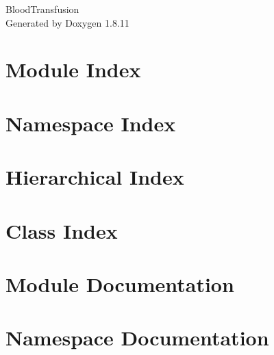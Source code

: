 \documentclass[twoside]{book}
\newcommand{\+}{\discretionary{\mbox{\scriptsize$\hookleftarrow$}}{}{}}
\newcommand{\clearemptydoublepage}{%
  \newpage{\pagestyle{empty}\cleardoublepage}%
}
\begin{document}
\hypersetup{pageanchor=false,
             bookmarksnumbered=true,
             pdfencoding=unicode
            }
\begin{titlepage}
\vspace*{7cm}
\begin{center}%
{\Large Blood\+Transfusion }\\
\vspace*{1cm}
{\large Generated by Doxygen 1.8.11}\\
\end{center}
\end{titlepage}
\clearemptydoublepage
\tableofcontents
\clearemptydoublepage
{}
\hypersetup{pageanchor=true}

\chapter{Module Index}

\chapter{Namespace Index}

\chapter{Hierarchical Index}

\chapter{Class Index}

\chapter{Module Documentation}

\chapter{Namespace Documentation}





\end{document}
